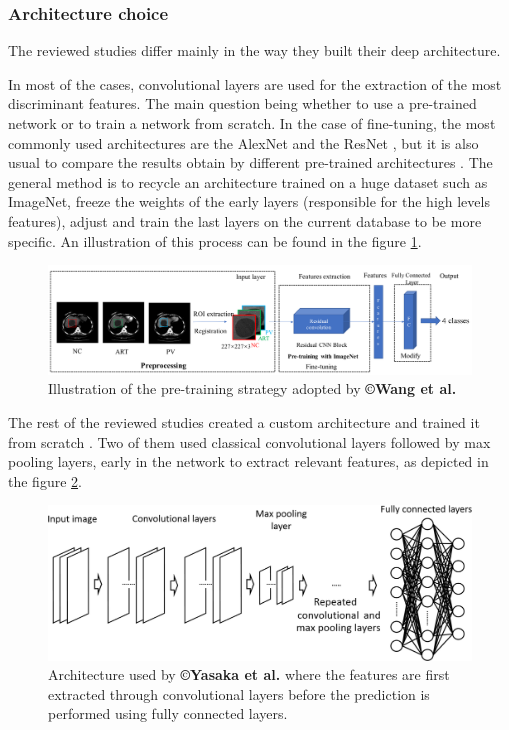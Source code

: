 \subsubsection{Architecture choice}\label{architecure-choice}



The reviewed studies differ mainly in the way they built their deep
architecture.

In most of the cases, convolutional layers are used for the extraction
of the most discriminant features. The main question being whether to
use a pre-trained network or to train a network from scratch. In the
case of fine-tuning, the most commonly used architectures are the
AlexNet and the ResNet \cite{WANG2019,Wang2018,Yamada2019,Peng2020}, but it is also usual to
compare the results obtain by different pre-trained architectures \cite{WANG2019,Yamada2019}. The general method
is to recycle an architecture trained on a huge dataset such as
ImageNet, freeze the weights of the early layers (responsible for the
high levels features), adjust and train the last layers on the current
database to be more specific.
An illustration of this process can be found in the figure \ref{Wang2018_Fig3}.

\begin{figure}[th!]
\centering
\includegraphics[width=0.9\linewidth]{images/image6_crop}
\caption{Illustration of the pre-training strategy adopted by \textbf{©Wang et al.} \cite{Wang2018}}
\label{Wang2018_Fig3}
\end{figure}


The rest of the reviewed studies created a custom architecture and
trained it from scratch \cite{Yasaka2018a,Yasaka2018,Liang2018,Yang2019}.
Two of them used classical convolutional layers followed by max pooling
layers, early in the network to extract relevant features, as depicted
in the figure \ref{Yasaka2018_Fig2}.

\begin{figure}[th!]
\centering
\includegraphics[width=0.7\linewidth]{images/yasaka2018}
\caption{Architecture used by \textbf{©Yasaka et al.} where the features are first extracted through convolutional layers before the prediction is performed using fully connected layers. \cite{Yasaka2018}}
\label{Yasaka2018_Fig2}
\end{figure}

